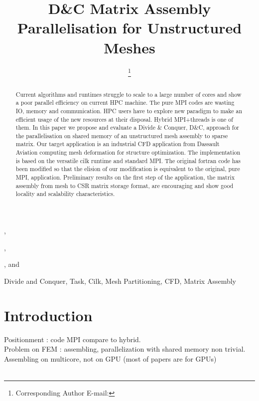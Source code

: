 \documentclass{IOS-Book-Article}
\begin{document}
\begin{frontmatter}              %

\title{D\&C Matrix Assembly Parallelisation for Unstructured Meshes}

\author[A]{ %
\thanks{Corresponding Author E-mail: }},
\author[A]{ },
\author[B]{ },
and
\author[C]{ }

\address[A]{PRISM - University of Versailles, France}
\address[B]{Somwhere}
\address[C]{Dassault Aviation, Saint-Cloud, France}

\begin{abstract}
Current algorithms and runtimes struggle to scale to a large number of cores and show a poor parallel efficiency on current HPC machine.
The pure MPI codes are wasting IO, memory and communication. HPC users have to explore new paradigm to make an efficient usage of the new resources at their disposal.
Hybrid MPI+threads is one of them. In this paper we propose and evaluate a Divide \& Conquer, D\&C, approach for the parallelisation on shared memory of an unstructured mesh assembly to sparse matrix.
Our target application is an industrial CFD application from Dassault Aviation computing mesh deformation for structure optimization.
The implementation is based on the versatile cilk runtime and standard MPI. The original fortran code has been modified so that the elision of our modification is equivalent to the original, pure MPI, application.
Preliminary results on the first step of the application, the matrix assembly from mesh to CSR matrix storage format, are encouraging and show good locality and scalability characteristics.
\end{abstract}

\begin{keyword}
Divide and Conquer, Task, Cilk, Mesh Partitioning, CFD, Matrix Assembly 
\end{keyword}
\end{frontmatter}

\thispagestyle{empty}
\pagestyle{empty}

\section{Introduction}
Positionment : code MPI compare to hybrid.\\
Problem on FEM : assembling, parallelization with shared memory non trivial.\\
Assembling on multicore, not on GPU (most of papers are for GPUs)\\\\
\end{document}
